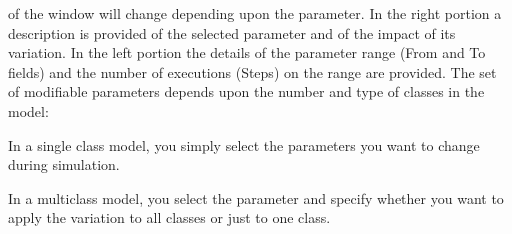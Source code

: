 of the window will change depending upon the parameter. In the
right portion a description is provided of the selected parameter
and of the impact of its variation. In the left portion the
details of the parameter range (From and To fields) and the number
of executions (Steps) on the range are provided. The set of
modifiable parameters depends upon the number and type of classes
in the model:
\begin{itemize*}
\item In a single class model, you simply select the parameters you want to change during simulation.
\item In a multiclass model, you select the parameter and specify whether you want to apply the variation to all classes or just to one class.
\end{itemize*}

